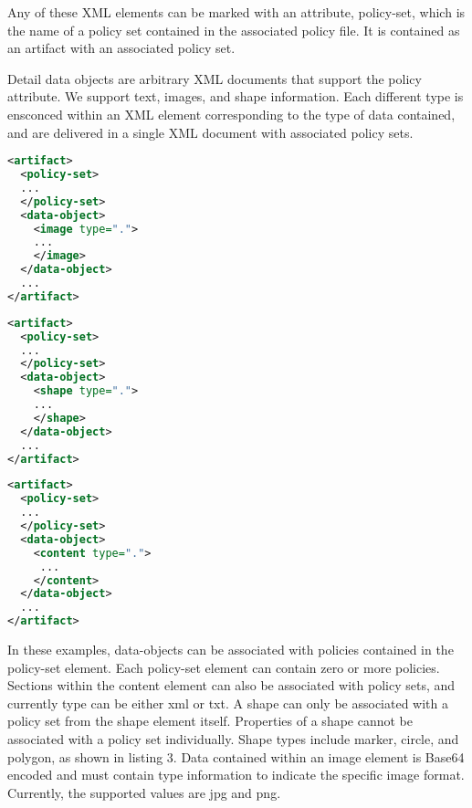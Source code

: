 Any of these XML elements can be marked with an attribute, policy-set, which is the name of a policy set contained in the associated policy file.  It is contained as an artifact with an associated policy set.

Detail data objects are arbitrary XML documents that support the policy attribute.  We support text, images, and shape information.  Each different type is ensconced within an XML element corresponding to the type of data contained, and are delivered in a single XML document with associated policy sets.


\par\noindent
\begin{minipage}[t]{.30\textwidth}
\begin{lstlisting}[language=xml, label=lst:image-data, caption=Image]
<artifact>
  <policy-set>
  ...
  </policy-set>
  <data-object>
    <image type=".">
    ...
    </image>
  </data-object>
  ...
</artifact>
\end{lstlisting}
\end{minipage}
\hfill
\begin{minipage}[t]{.30\textwidth}
\begin{lstlisting}[language=xml, label=lst:shape-data, caption=Shape]
<artifact>
  <policy-set>
  ...
  </policy-set>
  <data-object>
    <shape type=".">
    ...
    </shape>
  </data-object>
  ...
</artifact>
\end{lstlisting}
\end{minipage}
\hfill
\begin{minipage}[t]{.30\textwidth}
\begin{lstlisting}[language=xml, label=lst:content-data, caption=Content]
<artifact>
  <policy-set>
  ...
  </policy-set>
  <data-object>
    <content type=".">
     ...
    </content>
  </data-object>
  ...
</artifact>
\end{lstlisting}
\end{minipage}

In these examples, data-objects can be associated with policies contained in the policy-set element.  Each policy-set element can contain zero or more policies.  Sections within the content element can also be associated with policy sets, and currently type can be either xml or txt.  A shape can only be associated with a policy set from the shape element itself.  Properties of a shape cannot be associated with a policy set individually.  Shape types include marker, circle, and polygon, as shown in listing 3. Data contained within an image element is Base64 encoded and must contain type information to indicate the specific image format.  Currently, the supported values are jpg and png.

